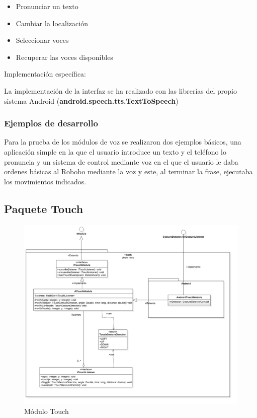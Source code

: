 \begin{itemize}
	\item Pronunciar un texto
	\item Cambiar la localización 
	\item Seleccionar voces
	\item Recuperar las voces disponibles
\end{itemize}

 


Implementación específica:

La implementación de la interfaz se ha realizado con las librerías del propio sistema Android (\textbf{android.speech.tts.TextToSpeech})

\subsubsection*{Ejemplos de desarrollo}

Para la prueba de los módulos de voz se realizaron dos ejemplos básicos, una aplicación simple en la que el usuario introduce un texto y el teléfono lo pronuncia y un sistema de control mediante voz en el que el usuario le daba ordenes básicas al Robobo mediante la voz y este, al terminar la frase, ejecutaba los movimientos indicados.
\newpage
\subsection{Paquete Touch}


\begin{figure}
	\centering
	\includegraphics[width=1\linewidth]{imagenes/diagramas/TouchModule.png}
	\caption{Módulo Touch}
	\label{fig:touch-module}
\end{figure}



